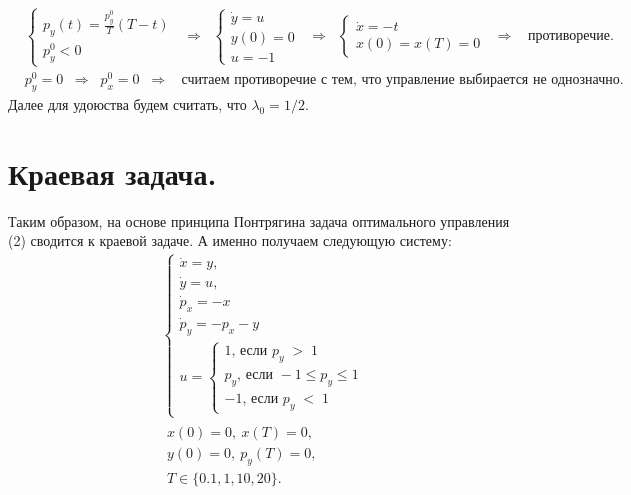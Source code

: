 \documentclass[a4paper,12pt]{article}
\begin{document}
\begin{align*}
        \\
        &\left\{
        \begin{array}{l}
            p_y(t)=\frac{p_y^0}{T}(T-t)
            \\
            p_y^0<0
        \end{array}
        \right.
        \;\;\Rightarrow\;\;
        \left\{
        \begin{array}{l}
            {\dot y}=u
            \\
            y(0)=0
            \\
            u=-1
        \end{array}
        \right.
        \;\;\Rightarrow\;\;
        \left\{
        \begin{array}{l}
            {\dot x}=-t
            \\
            x(0)=x(T)=0
        \end{array}
        \right.
        \;\;\Rightarrow\;\;
        \text{ противоречие.}
        \\
        &p_y^0=0
        \;\;\Rightarrow\;\;
        p_x^0=0
        \;\;\Rightarrow\;\;
        \text{ считаем противоречие с тем, что управление выбирается не однозначно.}
\end{align*}
Далее для удоюства будем считать, что $\lambda_0=1/2.$

\section{Краевая задача.}

Таким образом, на основе принципа Понтрягина задача оптимального управления (2) сводится к краевой задаче. А именно получаем следующую систему:
\begin{align}
    &\left\{
        \begin{array}{l}
            \dot x =y,\\
            \dot y= u,\\
            \dot p_x= -x\\
            \dot p_y= -p_x -y\\
            u=\left\{
            \begin{array}{l}
                1 \text{, если } p_y\;>\;1\\
                p_y \text{, если } -1 \leq p_y\leq 1\\
                -1 \text{, если } p_y\;<\;1
            \end{array}
            \right.
        \end{array}
    \right.
    \\
    &\begin{array}{l}
        x(0)=0, \: x(T)=0,\\
        y(0)=0, \: p_y(T)=0,\\
        T \in \{0.1,1,10,20\}.
    \end{array}
\end{align}
\end{document}

